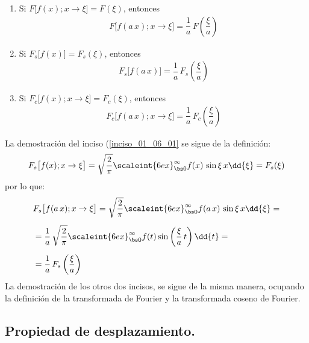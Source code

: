 \begin{enumerate}[\thesubsection .1)]
\item Si $F \big[ f (x); x \to \xi \big] = F (\xi)$, entonces
\begin{align*}
F \big[ f(a \, x); x \to \xi \big] = \dfrac{1}{a} \, F \left( \dfrac{\xi}{a} \right)
\end{align*}
\item \label{inciso_01_06_01} Si $F_{s} \big[ f (x) \big] = F_{s}(\xi)$, entonces
\begin{align*}
F_{s} \big[f(a \, x) \big] = \dfrac{1}{a} \, F_{s} \left( \dfrac{\xi}{a} \right)
\end{align*}
\item Si $F_{c} \big[ f (x); x \to \xi \big] = F_{c}(\xi)$, entonces
\begin{align*}
F_{c} \big[ f(a \, x); x \to \xi \big] = \dfrac{1}{a} \, F_{c} \left( \dfrac{\xi}{a} \right)
\end{align*}
\end{enumerate}
La demostración del inciso (\ref{inciso_01_06_01} se sigue de la definición:
\begin{align*}
F_{s} \big[ f (x); x \to \xi \big] = \sqrt{\dfrac{2}{\pi}} \scaleint{6ex}_{\bs 0}^{\infty} f (x) \, \sin \xi \, x \dd{\xi} = F_{s} (\xi)
\end{align*}
por lo que:
\begin{align*}
&F_{s} \big[ f(a \, x); x \to \xi \big] = \sqrt{\dfrac{2}{\pi}} \scaleint{6ex}_{\bs 0}^{\infty} f(a \, x) \, \sin \xi \, x \dd{\xi} = \\[0.5em]
&= \dfrac{1}{a} \, \sqrt{\dfrac{2}{\pi}} \scaleint{6ex}_{\bs 0}^{\infty} f(t) \sin \left( \dfrac{\xi}{a} \, t \right) \dd{t} = \\[0.5em]
&= \dfrac{1}{a} \, F_{s} \left( \dfrac{\xi}{a} \right)
\end{align*}
La demostración de los otros dos incisos, se sigue de la misma manera, ocupando la definición de la transformada de Fourier y la transformada coseno de Fourier.

\subsection{Propiedad de desplazamiento.}

